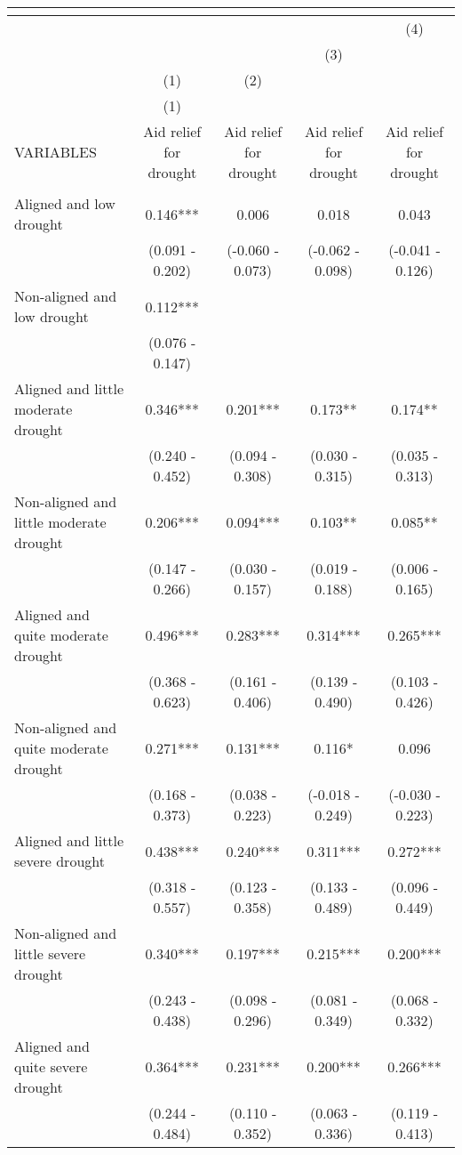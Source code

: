 \begin{tabular}{lcccc}
\multicolumn{5}{c}{} \\ \hline
 &  &  &  & (4) \\
 &  &  & (3) &  \\
 & (1) & (2) &  &  \\
 & (1) &  &  &  \\
VARIABLES & Aid relief for drought & Aid relief for drought & Aid relief for drought & Aid relief for drought \\ \hline
 &  &  &  &  \\
Aligned and low drought & 0.146*** & 0.006 & 0.018 & 0.043 \\
 & (0.091 - 0.202) & (-0.060 - 0.073) & (-0.062 - 0.098) & (-0.041 - 0.126) \\
Non-aligned and low drought & 0.112*** &  &  &  \\
 & (0.076 - 0.147) &  &  &  \\
Aligned and little moderate drought & 0.346*** & 0.201*** & 0.173** & 0.174** \\
 & (0.240 - 0.452) & (0.094 - 0.308) & (0.030 - 0.315) & (0.035 - 0.313) \\
Non-aligned and little moderate drought & 0.206*** & 0.094*** & 0.103** & 0.085** \\
 & (0.147 - 0.266) & (0.030 - 0.157) & (0.019 - 0.188) & (0.006 - 0.165) \\
Aligned and quite moderate drought & 0.496*** & 0.283*** & 0.314*** & 0.265*** \\
 & (0.368 - 0.623) & (0.161 - 0.406) & (0.139 - 0.490) & (0.103 - 0.426) \\
Non-aligned and quite moderate drought & 0.271*** & 0.131*** & 0.116* & 0.096 \\
 & (0.168 - 0.373) & (0.038 - 0.223) & (-0.018 - 0.249) & (-0.030 - 0.223) \\
Aligned and little severe drought & 0.438*** & 0.240*** & 0.311*** & 0.272*** \\
 & (0.318 - 0.557) & (0.123 - 0.358) & (0.133 - 0.489) & (0.096 - 0.449) \\
Non-aligned and little severe drought & 0.340*** & 0.197*** & 0.215*** & 0.200*** \\
 & (0.243 - 0.438) & (0.098 - 0.296) & (0.081 - 0.349) & (0.068 - 0.332) \\
Aligned and quite severe drought & 0.364*** & 0.231*** & 0.200*** & 0.266*** \\
 & (0.244 - 0.484) & (0.110 - 0.352) & (0.063 - 0.336) & (0.119 - 0.413) \\

\end{tabular}
